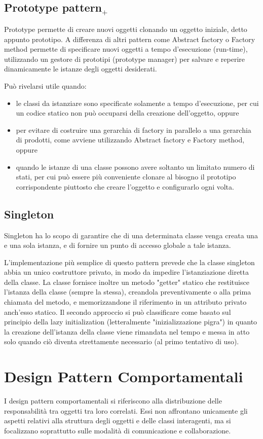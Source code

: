 \subsection{Prototype pattern$_+$}
Prototype permette di creare nuovi oggetti clonando un oggetto iniziale, detto appunto prototipo. A differenza di altri pattern come Abstract factory o Factory method permette di specificare nuovi oggetti a tempo d'esecuzione (run-time), utilizzando un gestore di prototipi (prototype manager) per salvare e reperire dinamicamente le istanze degli oggetti desiderati.

Può rivelarsi utile quando:
\begin{itemize}
\item le classi da istanziare sono specificate solamente a tempo d'esecuzione, per cui un codice statico non può occuparsi della creazione dell'oggetto, oppure
\item per evitare di costruire una gerarchia di factory in parallelo a una gerarchia di prodotti, come avviene utilizzando Abstract factory e Factory method, oppure
\item quando le istanze di una classe possono avere soltanto un limitato numero di stati, per cui può essere più conveniente clonare al bisogno il prototipo corrispondente piuttosto che creare l'oggetto e configurarlo ogni volta.
\end{itemize}
\subsection{Singleton}
Singleton ha lo scopo di garantire che di una determinata classe venga creata una e una sola istanza, e di fornire un punto di accesso globale a tale istanza.

L'implementazione più semplice di questo pattern prevede che la classe singleton abbia un unico costruttore privato, in modo da impedire l'istanziazione diretta della classe. La classe fornisce inoltre un metodo "getter" statico che restituisce l'istanza della classe (sempre la stessa), creandola preventivamente o alla prima chiamata del metodo, e memorizzandone il riferimento in un attributo privato anch'esso statico. Il secondo approccio si può classificare come basato sul principio della lazy initialization (letteralmente "inizializzazione pigra") in quanto la creazione dell'istanza della classe viene rimandata nel tempo e messa in atto solo quando ciò diventa strettamente necessario (al primo tentativo di uso).

\section{Design Pattern Comportamentali}
I design pattern comportamentali si riferiscono alla distribuzione delle responsabilità tra oggetti tra loro correlati. Essi non affrontano unicamente gli aspetti relativi alla struttura degli oggetti e delle classi interagenti, ma si focalizzano soprattutto sulle modalità di comunicazione e collaborazione.

